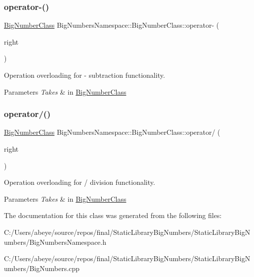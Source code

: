 \subsubsection{\texorpdfstring{operator-\/()}{operator-()}}
{\footnotesize\ttfamily \mbox{\hyperlink{class_big_numbers_namespace_1_1_big_number_class}{Big\+Number\+Class}} Big\+Numbers\+Namespace\+::\+Big\+Number\+Class\+::operator-\/ (\begin{DoxyParamCaption}\item[{\mbox{\hyperlink{class_big_numbers_namespace_1_1_big_number_class}{Big\+Number\+Class}}}]{right }\end{DoxyParamCaption})}



Operation overloading for -\/ subtraction functionality. 


\begin{DoxyParams}{Parameters}
{\em Takes} & in \mbox{\hyperlink{class_big_numbers_namespace_1_1_big_number_class}{Big\+Number\+Class}} \\
\hline
\end{DoxyParams}
\mbox{\label{class_big_numbers_namespace_1_1_big_number_class_a47624997c4ce429d71a0acb8a9da822f}} 
\subsubsection{\texorpdfstring{operator/()}{operator/()}}
{\footnotesize\ttfamily \mbox{\hyperlink{class_big_numbers_namespace_1_1_big_number_class}{Big\+Number\+Class}} Big\+Numbers\+Namespace\+::\+Big\+Number\+Class\+::operator/ (\begin{DoxyParamCaption}\item[{\mbox{\hyperlink{class_big_numbers_namespace_1_1_big_number_class}{Big\+Number\+Class}}}]{right }\end{DoxyParamCaption})}



Operation overloading for / division functionality. 


\begin{DoxyParams}{Parameters}
{\em Takes} & in \mbox{\hyperlink{class_big_numbers_namespace_1_1_big_number_class}{Big\+Number\+Class}} \\
\hline
\end{DoxyParams}


The documentation for this class was generated from the following files\+:\begin{DoxyCompactItemize}
\item 
C\+:/\+Users/abeye/source/repos/final/\+Static\+Library\+Big\+Numbers/\+Static\+Library\+Big\+Numbers/Big\+Numbers\+Namespace.\+h\item 
C\+:/\+Users/abeye/source/repos/final/\+Static\+Library\+Big\+Numbers/\+Static\+Library\+Big\+Numbers/Big\+Numbers.\+cpp\end{DoxyCompactItemize}
